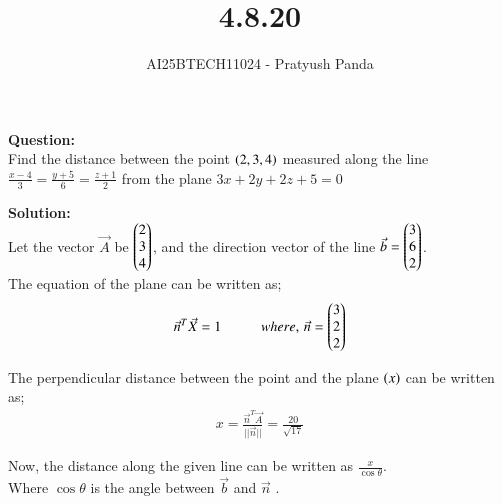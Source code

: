 \documentclass[journal]{IEEEtran}
\begin{document}

\vspace{3cm}

\title{4.8.20}
\author{AI25BTECH11024 - Pratyush Panda
}
\maketitle
{\let\newpage\relax\maketitle}

\renewcommand{\thefigure}{\theenumi}
\renewcommand{\thetable}{\theenumi}
\setlength{\intextsep}{10pt} %


\renewcommand{\thetable}{\theenumi}

\textbf{Question: } \\
Find the distance between the point $\left(2,3,4\right)$ measured along the line $\frac{x-4}{3}=\frac{y+5}{6}=\frac{z+1}{2}$ from the plane $3x+2y+2z+5=0$
\vspace{0.7cm}

\textbf{Solution: } \\
Let the vector $\Vec{A}$ be $\begin{pmatrix}2 \\ 3 \\ 4\end{pmatrix}$, and the direction vector of the line $\Vec{b}=\begin{pmatrix}3 \\ 6 \\ 2\end{pmatrix}$. \\
The equation of the plane can be written as;
\begin{align}
\Vec{n}^T\Vec{X}=1 \hspace{1cm} where, \, \Vec{n}=\begin{pmatrix}3 \\ 2 \\ 2\end{pmatrix}
\end{align}

The perpendicular distance between the point and the plane $\left(x\right)$ can be written as;
\begin{align}
x=\frac{\Vec{n}^T\Vec{A}}{||\Vec{n}||}=\frac{20}{\sqrt{17}}
\end{align}

Now, the distance along the given line can be written as $\frac{x}{\cos\theta}$. \\
Where $\cos\theta$ is the angle between $\Vec{b}$  and $\Vec{n}$ . \\
\end{document}
